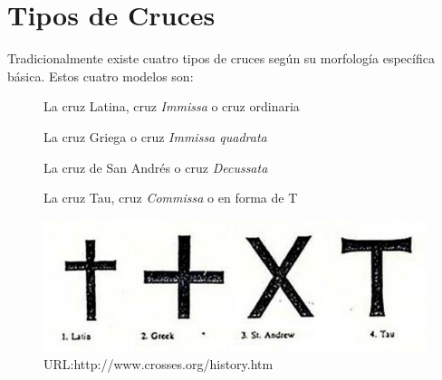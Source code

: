 \section{Tipos de Cruces} \label{app:crosses}
Tradicionalmente existe cuatro tipos de cruces según su morfología específica básica. Estos cuatro modelos son:

\begin{description}
\item[] La cruz Latina, cruz \textit{Immissa} o cruz ordinaria
\item[] La cruz Griega o cruz \textit{Immissa quadrata}
\item[] La cruz de San Andrés o cruz \textit{Decussata}
\item[] La cruz Tau, cruz \textit{Commissa} o en forma de T
\end{description}


\begin{figure}[ht!]
    \centering
    \includegraphics[width=1\textwidth]{cruces.jpg}
    \caption{URL:http://www.crosses.org/history.htm}
\end{figure}